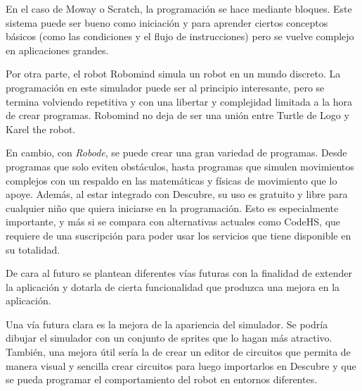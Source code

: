 En el caso de Moway o Scratch, la programación se hace mediante bloques. Este sistema puede ser bueno como iniciación y para aprender ciertos conceptos básicos (como las condiciones y el flujo de instrucciones) pero se vuelve complejo en aplicaciones grandes. 

Por otra parte, el robot Robomind simula un robot en un mundo discreto. La programación en este simulador puede ser al principio interesante, pero se termina volviendo repetitiva y con una libertar y complejidad limitada a la hora de crear programas. Robomind no deja de ser una unión entre Turtle de Logo y Karel the robot. 

En cambio, con \emph{Robode}, se puede crear una gran variedad de programas. Desde programas que solo eviten obstáculos, hasta programas que simulen movimientos complejos con un respaldo en las matemáticas y físicas de movimiento que lo apoye. Además, al estar integrado con Descubre, su uso es gratuito y libre para cualquier niño que quiera iniciarse en la programación. Esto es especialmente importante, y más si se compara con alternativas actuales como CodeHS, que requiere de una suscripción para poder usar los servicios que tiene disponible en su totalidad.





De cara al futuro se plantean diferentes vías futuras con la finalidad de extender la aplicación y dotarla de cierta funcionalidad que produzca una mejora en la aplicación.

Una vía futura clara es la mejora de la apariencia del simulador. Se podría dibujar el simulador con un conjunto de sprites que lo hagan más atractivo. También, una mejora útil sería la de crear un editor de circuitos que permita de manera visual y sencilla crear circuitos para luego importarlos en Descubre y que se pueda programar el comportamiento del robot en entornos diferentes. 
